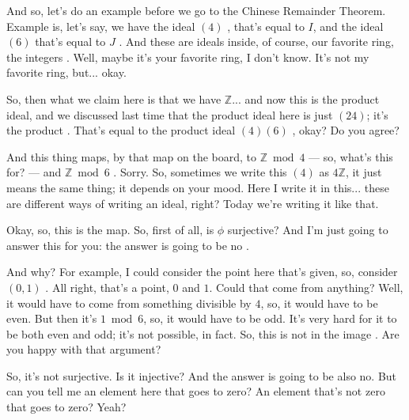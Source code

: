 \begin{speech}[00:02:30 - 00:04:48]
And so, let's do an example before we go to the Chinese Remainder Theorem. Example is, let's say, we have the ideal $(4)$ , that's equal to $I$, and the ideal $(6)$ that's equal to $J$ . And these are ideals inside, of course, our favorite ring, the integers . Well, maybe it's your favorite ring, I don't know. It's not my favorite ring, but... okay.

So, then what we claim here is that we have $\mathbb{Z}$... and now this is the product ideal, and we discussed last time that the product ideal here is just $(24)$; it's the product . That's equal to the product ideal $(4)(6)$ , okay? Do you agree?

And this thing maps, by that map on the board, to $\mathbb{Z} \bmod 4$ --- so, what's this for? --- and $\mathbb{Z} \bmod 6$ . Sorry. So, sometimes we write this $(4)$ as $4\mathbb{Z}$, it just means the same thing; it depends on your mood. Here I write it in this... these are different ways of writing an ideal, right? Today we're writing it like that.

Okay, so, this is the map. So, first of all, is $\phi$ surjective?  And I'm just going to answer this for you: the answer is going to be no .

And why? For example, I could consider the point here that's given, so, consider $(0, 1)$ . All right, that's a point, $0$ and $1$. Could that come from anything? Well, it would have to come from something divisible by $4$, so, it would have to be even. But then it's $1 \bmod 6$, so, it would have to be odd. It's very hard for it to be both even and odd; it's not possible, in fact. So, this is not in the image . Are you happy with that argument?

So, it's not surjective. Is it injective?  And the answer is going to be also no. But can you tell me an element here that goes to zero? An element that's not zero that goes to zero? Yeah?
\end{speech}

